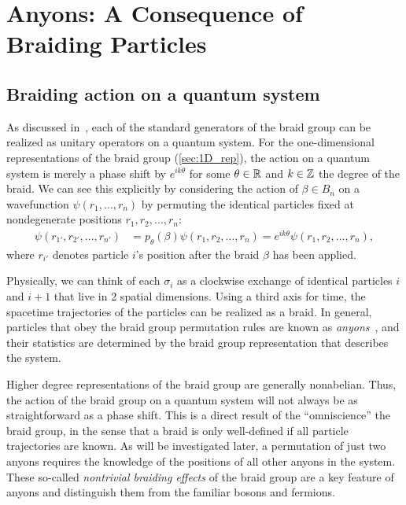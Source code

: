 \chapter{Anyons: A Consequence of Braiding Particles}\label{ch:anyons}

\section{Braiding action on a quantum system}
As discussed in~\cite{Deshmukh}, each of the standard generators of the braid group can be realized as unitary operators on a quantum system. For the one-dimensional representations of the braid group (\cref{sec:1D_rep}), the action on a quantum system is merely a phase shift by $e^{ik\theta}$ for some $\theta\in\mathbb{R}$ and $k\in\mathbb{Z}$ the degree of the braid. We can see this explicitly by considering the action of $\beta\in B_n$ on a wavefunction $\psi(r_1,\dots,r_n)$ by permuting the identical particles fixed at nondegenerate positions $r_1,r_2,\dots,r_n$:
\begin{align}
    \psi(r_{1'},r_{2'},\dots,r_{n'}) &= p_\theta(\beta)\psi(r_1,r_2,\dots,r_n) = e^{ik\theta}\psi(r_1,r_2,\dots,r_n),
\end{align}
where $r_{i'}$ denotes particle $i$'s position after the braid $\beta$ has been applied. 

Physically, we can think of each $\sigma_i$ as a clockwise exchange of identical particles $i$ and $i+1$ that live in 2 spatial dimensions. Using a third axis for time, the spacetime trajectories of the particles can be realized as a braid. In general, particles that obey the braid group permutation rules are known as \textit{anyons}~\cite{Wilczek1982}, and their statistics are determined by the braid group representation that describes the system.

Higher degree representations of the braid group are generally nonabelian. Thus, the action of the braid group on a quantum system will not always be as straightforward as a phase shift. This is a direct result of the ``omniscience'' the braid group, in the sense that a braid is only well-defined if all particle trajectories are known. As will be investigated later, a permutation of just two anyons requires the knowledge of the positions of all other anyons in the system. 
These so-called \textit{nontrivial braiding effects} of the braid group are a key feature of anyons and distinguish them from the familiar bosons and fermions.

